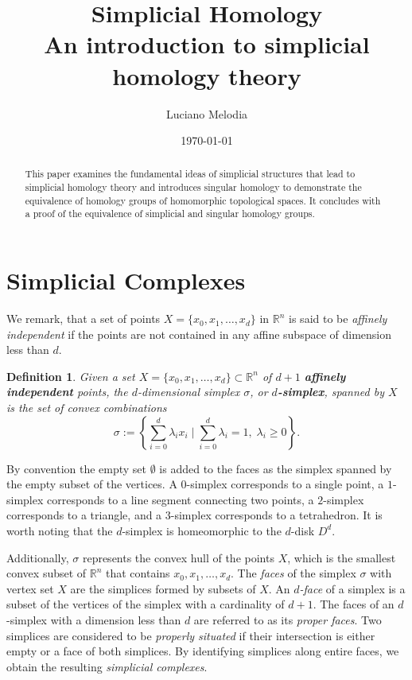 \documentclass{article}
\title{\textbf{Simplicial Homology} \\[0.2cm] \large An introduction to simplicial homology theory}
\author{Luciano Melodia}
\date{\today}
\newtheorem*{definition}{Definition}
\begin{document}
\maketitle
\begin{abstract}
This paper examines the fundamental ideas of simplicial structures that lead to simplicial homology theory and introduces singular homology to demonstrate the equivalence of homology groups of homomorphic topological spaces. It concludes with a proof of the equivalence of simplicial and singular homology groups.
\end{abstract}
\tableofcontents

\section{Simplicial Complexes}
We remark, that a set of points $X = \{x_0, x_1, \ldots, x_d\}$ in $\mathbb{R}^n$ is said to be \emph{affinely independent} if the points are not contained in any affine subspace of dimension less than $d$.

\begin{definition}
Given a set $X = \{x_0, x_1, \ldots, x_d\} \subset \mathbb{R}^n$ of $d+1$ \textbf{affinely independent} points, the $d$-dimensional simplex $\sigma$, or \textbf{\emph{$d$-simplex}}, spanned by $X$ is the set of convex combinations
\begin{equation}
	\sigma := \left\{\sum_{i=0}^{d} \lambda_i x_i \; \vert \; \sum_{i=0}^{d} \lambda_i = 1, \; \lambda_i \geq 0 \right\}.
\end{equation}
\end{definition}

By convention the empty set $\emptyset$ is added to the faces as the simplex spanned by the empty subset of the vertices. A $0$-simplex corresponds to a single point, a $1$-simplex corresponds to a line segment connecting two points, a $2$-simplex corresponds to a triangle, and a $3$-simplex corresponds to a tetrahedron. It is worth noting that the $d$-simplex is homeomorphic to the $d$-disk $D^d$. 

Additionally, $\sigma$ represents the convex hull of the points $X$, which is the smallest convex subset of $\mathbb{R}^n$ that contains $x_0, x_1, \ldots, x_d$. The \emph{faces} of the simplex $\sigma$ with vertex set $X$ are the simplices formed by subsets of $X$. An \emph{$d$-face} of a simplex is a subset of the vertices of the simplex with a cardinality of $d+1$. The faces of an $d$-simplex with a dimension less than $d$ are referred to as its \emph{proper faces}. Two simplices are considered to be \emph{properly situated} if their intersection is either empty or a face of both simplices. By identifying simplices along entire faces, we obtain the resulting \emph{simplicial complexes}.
\end{document}
